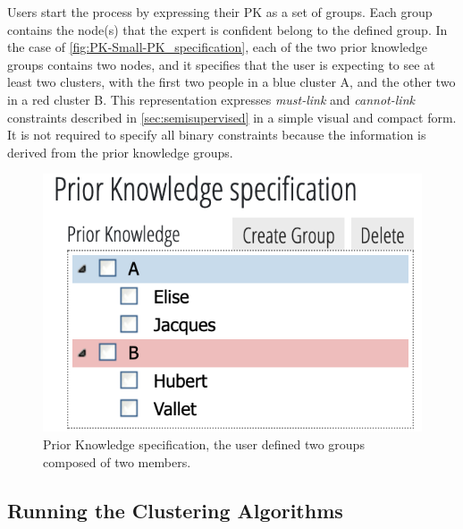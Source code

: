 Users start the process by expressing their PK as a set of groups. Each group contains the node(s) that the expert is confident belong to the defined group.
In the case of \autoref{fig:PK-Small-PK_specification}, each of the two prior knowledge groups contains two nodes, and it specifies that the user is expecting to see at least two clusters, with the first two people in a blue cluster A, and the other two in a red cluster B.
This representation expresses \emph{must-link} and \emph{cannot-link} constraints described in \autoref{sec:semisupervised} in a simple visual and compact form. It is not required to specify all binary constraints because the information is derived from the prior knowledge groups.

\begin{figure}[!ht]
\centering
\includegraphics[trim={15 0 0 30}, clip, width=0.6\linewidth]{static/figures/PK-Clustering/VISPaperFigures/Small-PK_specification}
\caption{Prior Knowledge specification, the user defined two groups composed of two members.}%
\label{fig:PK-Small-PK_specification}
\end{figure}

\subsection{Running the Clustering Algorithms} \label{sub:families}

